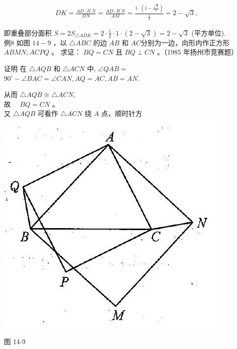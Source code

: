 \documentclass[10pt]{article}
\begin{document}
\begin{align*}
D K=\frac{A D \cdot B^{\prime} N}{D N}=\frac{A D \cdot B^{\prime} N}{A M}=\frac{1 \cdot\left(1-\frac{\sqrt{3}}{2}\right)}{\frac{1}{2}}=2-\sqrt{3},
\end{align*}

即重叠部分面积 $S=2 S_{\triangle A D K}=2 \cdot \frac{1}{2} \cdot 1 \cdot(2-\sqrt{3})=2-\sqrt{3}$ (平方单位).\\
例8 如图 $14-9$ ，以 $\triangle A B C$ 的边 $A B$ 和 $A C$分别为一边，向形内作正方形 $A B M N, A C P Q$ 。 求证： $B Q=C N$ 且 $B Q \perp C N$ 。（1985 年扬州市竞赛题）

证明 在 $\triangle A Q B$ 和 $\triangle A C N$ 中, $\angle Q A B=$ $90^{\circ}-\angle B A C=\angle C A N, A Q=A C, A B=A N$.

从而 $\triangle A Q B \cong \triangle A C N$,\\
故 $\quad B Q=C N$ 。\\
又 $\triangle A Q B$ 可看作 $\triangle A C N$ 绕 $A$ 点，顺时针方\\
\includegraphics[max width=\textwidth, center]{2024_10_30_2c8f45efd4a519b08e1ag-131(1)}

图 14-9
\end{document}

